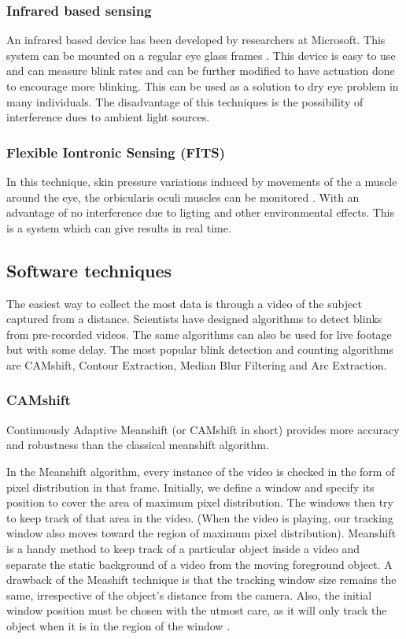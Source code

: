 \documentclass[conference]{IEEEtran}
\begin{document}
\subsubsection{Infrared based sensing}
An infrared based device has been developed by researchers at Microsoft. This system can be mounted on a regular eye glass frames \cite{Microsoft}. This device is easy to use and can measure blink rates and can be further modified to have actuation done to encourage more blinking. This can be used as a solution to dry eye problem in many individuals. The disadvantage of this techniques is the possibility of interference dues to ambient light sources.

\subsubsection{Flexible Iontronic Sensing (FITS)}
In this technique,  skin pressure variations induced by movements of the a muscle around the eye, the orbicularis oculi muscles can be monitored \cite{Nih}. With an advantage of no interference due to ligting and other environmental effects. This is a system which can give results in real time. 


\subsection{Software techniques}
The easiest way to collect the most data is through a video of the subject captured from a distance. Scientists have designed algorithms to detect blinks from pre-recorded videos. The same algorithms can also be used for live footage but with some delay. The most popular blink detection and counting algorithms are CAMshift, Contour Extraction, Median Blur Filtering and Arc Extraction.

\subsubsection{CAMshift}
Continuously Adaptive Meanshift (or CAMshift in short) provides more accuracy and robustness than the classical meanshift algorithm.

In the Meanshift algorithm, every instance of the video is checked in the form of pixel distribution in that frame. Initially, we define a window and specify its position to cover the area of maximum pixel distribution. The windows then try to keep track of that area in the video. (When the video is playing, our tracking window also moves toward the region of maximum pixel distribution). Meanshift is a handy method to keep track of a particular object inside a video and separate the static background of a video from the moving foreground object. A drawback of the Meashift technique is that the tracking window size remains the same, irrespective of the object's distance from the camera. Also, the initial window position must be chosen with the utmost care, as it will only track the object when it is in the region of the window \cite{meanShift}.
\end{document}

